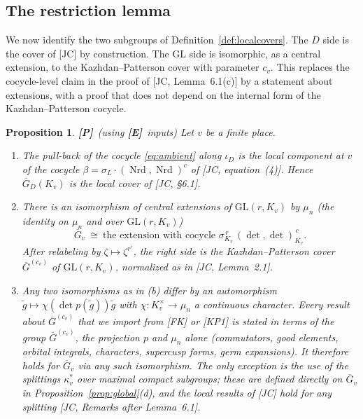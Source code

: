 \documentclass[12pt]{article}
\newcommand{\ov}[1]{\overline{#1}}
\newcommand{\Nrd}{\operatorname{Nrd}}
\newcommand{\GL}{\mathrm{GL}}
\newcommand{\Gb}{\ov{G}}
\newcommand{\GDb}{\ov{G}_D}
\newcommand{\ks}{\kappa^{*}}
\newcommand{\iD}{\iota_D}
\newcommand{\Pv}{\textbf{[P]}}
\newcommand{\Ev}{\textbf{[E]}}
\theoremstyle{plain}
\newtheorem{proposition}[theorem]{Proposition}
\theoremstyle{definition}
\begin{document}
\subsection{The restriction lemma}\label{subsec:restriction}
We now identify the two subgroups of Definition~\ref{def:localcovers}. The $D$ side is the cover of [JC] by construction. The $\GL$ side is isomorphic, as a central extension, to the Kazhdan--Patterson cover with parameter $c_v$. This replaces the cocycle-level claim in the proof of [JC, Lemma~6.1(c)] by a statement about extensions, with a proof that does not depend on the internal form of the Kazhdan--Patterson cocycle.

\begin{proposition}\label{prop:restriction}\Pv\ (using \Ev\ inputs)
Let $v$ be a finite place.
\begin{enumerate}[label=(\alph*)]
\item The pull-back of the cocycle \eqref{eq:ambient} along $\iD$ is the local component at $v$ of the cocycle $\beta=\sigma_L\cdot(\Nrd,\Nrd)^c$ of [JC, equation~(4)]. Hence $\GDb(K_v)$ is the local cover of [JC, \S6.1].
\item There is an isomorphism of central extensions of $\GL(r,K_v)$ by $\mu_n$ (the identity on $\mu_n$ and over $\GL(r,K_v)$)
\[ \Gb_v\ \cong\ \text{the extension with cocycle }\sigma_{K_v}^{\,r}\,(\det,\det)_{K_v}^{\,c}. \]
After relabeling by $\zeta\mapsto\zeta^{r'}$, the right side is the Kazhdan--Patterson cover $\Gb^{(c_v)}$ of $\GL(r,K_v)$, normalized as in [JC, Lemma~2.1].
\item Any two isomorphisms as in (b) differ by an automorphism $\tilde g\mapsto\chi(\det p(\tilde g))\tilde g$ with $\chi:K_v^\times\to\mu_n$ a continuous character. Every result about $\Gb^{(c_v)}$ that we import from [FK] or [KP1] is stated in terms of the group $\Gb^{(c_v)}$, the projection $p$ and $\mu_n$ alone (commutators, good elements, orbital integrals, characters, supercusp forms, germ expansions). It therefore holds for $\Gb_v$ via any such isomorphism. The only exception is the use of the splittings $\ks_v$ over maximal compact subgroups; these are defined directly on $\Gb_v$ in Proposition~\ref{prop:global}(d), and the local results of [JC] hold for any splitting [JC, Remarks after Lemma~6.1].
\end{enumerate}
\end{proposition}
\end{document}
